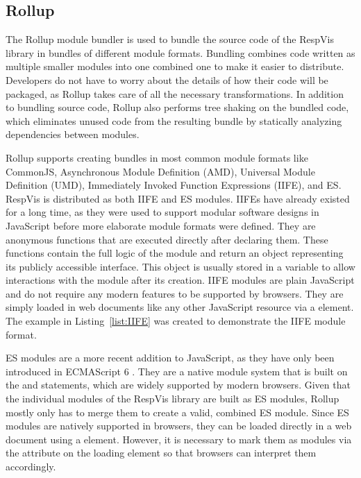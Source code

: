 \subsection{Rollup}
\label{sec:Rollup}

The Rollup module bundler is used to bundle the source code of the
RespVis library in bundles of different module formats.  Bundling
combines code written as multiple smaller modules into one combined
one to make it easier to distribute.  Developers do not have to worry
about the details of how their code will be packaged, as Rollup takes
care of all the necessary transformations.  In addition to bundling
source code, Rollup also performs tree shaking on the bundled code,
which eliminates unused code from the resulting bundle by statically
analyzing dependencies between modules.

Rollup supports creating bundles in most common module formats like
CommonJS, Asynchronous Module Definition (AMD), Universal Module
Definition (UMD), Immediately Invoked Function Expressions (IIFE), and
ES.  RespVis is distributed as both IIFE and ES modules.  IIFEs have
already existed for a long time, as they were used to support modular
software designs in JavaScript before more elaborate module formats
were defined.  They are anonymous functions that are executed directly
after declaring them.  These functions contain the full logic of the
module and return an object representing its publicly accessible
interface.  This object is usually stored in a variable to allow
interactions with the module after its creation.  IIFE modules are
plain JavaScript and do not require any modern features to be
supported by browsers.  They are simply loaded in web documents like
any other JavaScript resource via a  element.  The
example in Listing~\ref{list:IIFE} was created to demonstrate the IIFE
module format.

ES modules are a more recent addition to JavaScript, as they have only
been introduced in ECMAScript 6 \parencite{ECMAScript6}.  They are a
native module system that is built on the  and
 statements, which are widely supported by modern
browsers.  Given that the individual modules of the RespVis library
are built as ES modules, Rollup mostly only has to merge them to
create a valid, combined ES module.  Since ES modules are natively
supported in browsers, they can be loaded directly in a web document
using a  element.  However, it is necessary to mark
them as modules via the  attribute on the loading
 element so that browsers can interpret them
accordingly.


